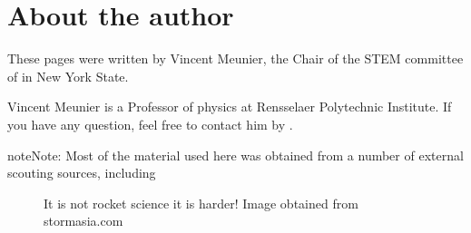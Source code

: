 \documentclass[letterpaper,10pt,english,openany,oneside]{sphinxmanual}
\let\sphinxpxdimen\pdfpxdimen\else\newdimen\sphinxpxdimen
\begin{document}
\chapter{About the author}
\label{\detokenize{contact:about-the-author}}\label{\detokenize{contact::doc}}
These pages were written by Vincent Meunier, the Chair of the STEM committee of  in New York State.

Vincent Meunier is a Professor of physics at Rensselaer Polytechnic Institute. If you have any question, feel free to contact him by .

\begin{sphinxadmonition}{note}{Note:}
Most of the material used here was obtained from a number of external scouting sources, including 
\end{sphinxadmonition}

\begin{figure}[htbp]
\centering
\capstart

\noindent\sphinxincludegraphics[width=600\sphinxpxdimen]{{rocket-1}.jpg}
\caption{It is not rocket science \sphinxhyphen{} it is harder! Image obtained from storm\sphinxhyphen{}asia.com}\label{\detokenize{index:id1}}\end{figure}



\renewcommand{\indexname}{Index}
\printindex
\end{document}
